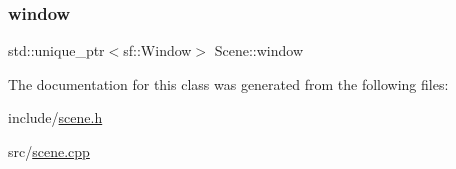 \mbox{\label{classScene_ab8f34017bc48b3c98e16be0ce44adf46}} 
\subsubsection{\texorpdfstring{window}{window}}
{\footnotesize\ttfamily std\+::unique\+\_\+ptr$<$sf\+::\+Window$>$ Scene\+::window\hspace{0.3cm}{\ttfamily [private]}}



The documentation for this class was generated from the following files\+:\begin{DoxyCompactItemize}
\item 
include/\hyperlink{scene_8h}{scene.\+h}\item 
src/\hyperlink{scene_8cpp}{scene.\+cpp}\end{DoxyCompactItemize}
